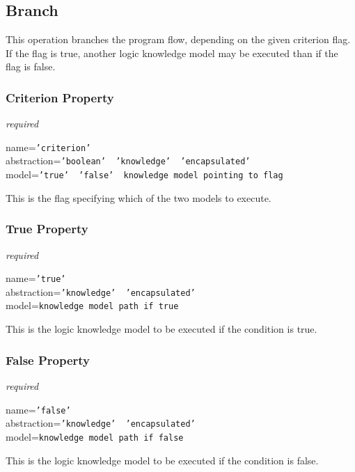 %
%
%
%
%
%

\subsection{Branch}
\label{branch_heading}

This operation branches the program flow, depending on the given criterion
flag. If the flag is true, another logic knowledge model may be executed than
if the flag is false.

\subsubsection{Criterion Property}

\emph{required}

name=\texttt{'criterion'}\\
abstraction=\texttt{'boolean' \vline\ 'knowledge' \vline\ 'encapsulated'}\\
model=\texttt{'true' \vline\ 'false' \vline\ knowledge model pointing to flag}

This is the flag specifying which of the two models to execute.

\subsubsection{True Property}

\emph{required}

name=\texttt{'true'}\\
abstraction=\texttt{'knowledge' \vline\ 'encapsulated'}\\
model=\texttt{knowledge model path if true}

This is the logic knowledge model to be executed if the condition is true.

\subsubsection{False Property}

\emph{required}

name=\texttt{'false'}\\
abstraction=\texttt{'knowledge' \vline\ 'encapsulated'}\\
model=\texttt{knowledge model path if false}

This is the logic knowledge model to be executed if the condition is false.
